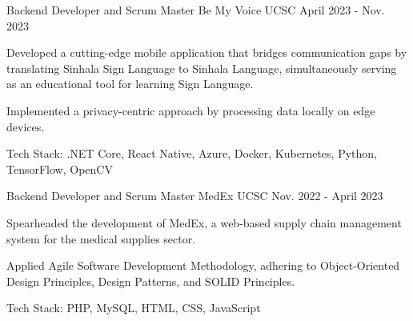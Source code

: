

\begin{cventries}

  \cventry
  {Backend Developer and Scrum Master} %
  {Be My Voice \href{https://github.com/kulasinghet/backend-be-voice}{\faGithubSquare}} %
  {UCSC} %
  {April 2023 - Nov. 2023} %
  {
    \begin{cvitems} %
      \item {Developed a cutting-edge mobile application that bridges communication gaps by translating Sinhala Sign Language to Sinhala Language, simultaneously serving as an educational tool for learning Sign Language.}
      \item {Implemented a privacy-centric approach by processing data locally on edge devices.}
      \item {Tech Stack: .NET Core, React Native, Azure, Docker, Kubernetes, Python, TensorFlow, OpenCV}
    \end{cvitems}
  }

  \cventry
  {Backend Developer and Scrum Master} %
  {MedEx \href{https://github.com/kulasinghet/MedEx}{\faGithubSquare}} %
  {UCSC} %
  {Nov. 2022 - April 2023} %
  {
    \begin{cvitems} %
      \item {Spearheaded the development of MedEx, a web-based supply chain management system for the medical supplies sector.}
      \item {Applied Agile Software Development Methodology, adhering to Object-Oriented Design Principles, Design Patterns, and SOLID Principles.}
      \item {Tech Stack: PHP, MySQL, HTML, CSS, JavaScript}
    \end{cvitems}
  }


\end{cventries}
